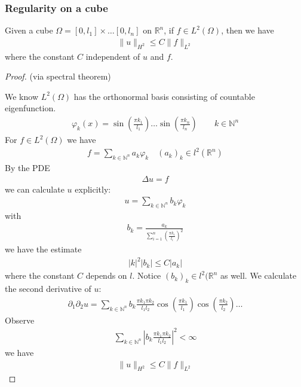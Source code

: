 \subsubsection{Regularity on a cube}
\begin{theorem}
	Given a cube $ \Omega = [0, l_1] \times \dots [0, l_n]$ on $\mathbb{R}^n$, if $f \in L^2(\Omega)$, then we have
	\begin{align*}
		\|u\|_{H^2} \le C \|f\|_{L^2}
	\end{align*}
	where the constant $C$ independent of $u$ and $f$. 
\end{theorem}
\begin{proof}(via spectral theorem)\par 
We know $L^2(\Omega)$ has the orthonormal basis consisting of countable eigenfunction. 
\begin{align*}
	\varphi_k(x) = \sin(\frac{\pi k_1}{l_1}) \dots \sin (\frac{\pi k_n}{l_n}) \qquad k \in \mathbb{N}^n
\end{align*}
For $f \in L^2(\Omega)$ we have 
\begin{align*}
	f = \sum_{k \in \mathbb{N}^n} a_k \varphi_k  \quad (a_k)_k \in l^2(\mathbb{R}^n) 
\end{align*}
By the PDE
\begin{align*}
	\Delta u = f
\end{align*}
we can calculate $u$ explicitly:
\begin{align*}
	u = \sum_{k \in \mathbb{N}^n} b_k \varphi_k
\end{align*}
with 
\begin{align*}
	b_k = \frac{a_k}{\sum_{i = 1}^n (\frac{\pi k_i}{l_i})^2}
\end{align*}
we have the estimate 
\begin{align*}
	|k|^2|b_k| \le C |a_k|
\end{align*}
where the constant $C$ depends on $l$. Notice $(b_k)_k \in l^2(\mathbb{R}^n$ as well. We calculate the second derivative of $u$:
\begin{align*}
	\partial_1 \partial_2 u = \sum_{k \in \mathbb{N}^n} b_k \frac{\pi k_1 \pi k_2}{l_1 l_2} \cos(\frac{\pi k_1}{l_1}) \cos(\frac{\pi k_2}{l_2}) \dots
\end{align*} 
Observe
\begin{align*}
	\sum_{k \in \mathbb{N}^n}  |b_k \frac{\pi k_1 \pi k_2}{l_1 l_2}|^2 < \infty
\end{align*}
we have 
\begin{align*}
	\|u\|_{H^2} \le C \|f\|_{L^2}
\end{align*}
\end{proof}


